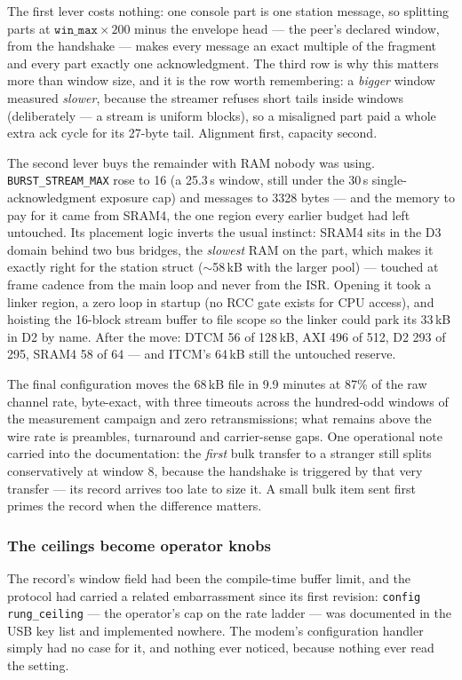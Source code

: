 The first lever costs nothing: one console part is one station
message, so splitting parts at $\mathtt{win\_max} \times 200$ minus
the envelope head --- the peer's declared window, from the handshake
--- makes every message an exact multiple of the fragment and every
part exactly one acknowledgment. The third row is why this matters
more than window size, and it is the row worth remembering: a
\emph{bigger} window measured \emph{slower}, because the streamer
refuses short tails inside windows (deliberately --- a stream is
uniform blocks), so a misaligned part paid a whole extra ack cycle for
its 27-byte tail. Alignment first, capacity second.

The second lever buys the remainder with RAM nobody was using.
\texttt{BURST\_STREAM\_MAX} rose to 16 (a 25.3\,s window, still
under the 30\,s single-acknowledgment exposure cap) and messages to
3328 bytes --- and the memory to pay for it came from SRAM4, the one
region every earlier budget had left untouched. Its placement logic
inverts the usual instinct: SRAM4 sits in the D3 domain behind two bus
bridges, the \emph{slowest} RAM on the part, which makes it exactly
right for the station struct ($\sim$58\,kB with the larger pool) ---
touched at frame cadence from the main loop and never from the ISR.
Opening it took a linker region, a zero loop in startup (no RCC gate
exists for CPU access), and hoisting the 16-block stream buffer to
file scope so the linker could park its 33\,kB in D2 by name. After
the move: DTCM 56 of 128\,kB, AXI 496 of 512, D2 293 of 295, SRAM4 58
of 64 --- and ITCM's 64\,kB still the untouched reserve.

The final configuration moves the 68\,kB file in 9.9 minutes at
87\% of the raw channel rate, byte-exact, with three timeouts across
the hundred-odd windows of the measurement campaign and zero
retransmissions; what remains above the wire rate is preambles,
turnaround and carrier-sense gaps. One operational note carried into
the documentation: the \emph{first} bulk transfer to a stranger still
splits conservatively at window 8, because the handshake is triggered
by that very transfer --- its record arrives too late to size it. A
small bulk item sent first primes the record when the difference
matters.

\subsubsection*{The ceilings become operator knobs}

The record's window field had been the compile-time buffer limit, and
the protocol had carried a related embarrassment since its first
revision: \texttt{config rung\_ceiling} --- the operator's cap on the
rate ladder --- was documented in the USB key list and implemented
nowhere. The modem's configuration handler simply had no case for it,
and nothing ever noticed, because nothing ever read the setting.

